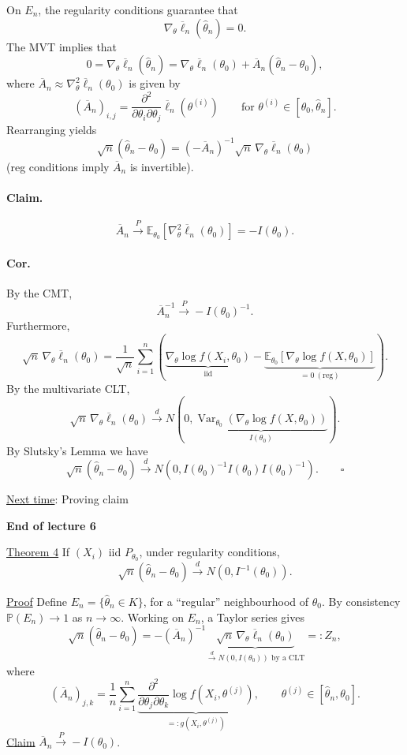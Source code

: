 \documentclass[11pt,a4paper]{article}
\begin{document}
On $E_n$, the regularity conditions guarantee that
\[
\nabla_\theta\overline{\ell}_n(\hat{\theta}_n)=0.
\]
The MVT implies that
\[
0=\nabla_\theta\overline{\ell}_n(\hat{\theta}_n)
=\nabla_\theta\overline{\ell}_n(\theta_0)
+\overline{A}_n(\hat{\theta}_n-\theta_0),
\]
where $\overline{A}_n\approx\nabla_\theta^2\overline{\ell}_n(\theta_0)$ is given by
\[
(\overline{A}_n)_{i,j}
=\frac{\partial^2}{\partial\theta_i\partial\theta_j}
\overline{\ell}_n(\theta^{(i)})
\qquad\text{for }\theta^{(i)}\in[\theta_0,\hat{\theta}_n].
\]
Rearranging yields
\[
\sqrt{n}(\hat{\theta}_n-\theta_0)
=(-\overline{A}_n)^{-1}\sqrt{n}\,\nabla_\theta\overline{\ell}_n(\theta_0)
\]
(reg conditions imply $\overline{A}_n$ is invertible).

\paragraph{Claim.}
\[
\overline{A}_n\xrightarrow{P}
\mathbb{E}_{\theta_0}[\nabla_\theta^2\overline{\ell}_n(\theta_0)]
=-I(\theta_0).
\]
\paragraph{Cor.}
By the CMT,
\[
\overline{A}_n^{-1}\xrightarrow{P}-I(\theta_0)^{-1}.
\]
Furthermore,
\[
\sqrt{n}\,\nabla_\theta\overline{\ell}_n(\theta_0)
=\frac{1}{\sqrt{n}}\sum_{i=1}^n
\left(\underbrace{\nabla_\theta\log f(X_i,\theta_0)}_{\mathrm{iid}}
-\underbrace{\mathbb{E}_{\theta_0}[\nabla_\theta\log f(X,\theta_0)]}
_{=0\ (\mathrm{reg})}\right).
\]
By the multivariate CLT,
\[
\sqrt{n}\,\nabla_\theta\overline{\ell}_n(\theta_0)
\xrightarrow{d}
N\left(0,\underbrace{\operatorname{Var}_{\theta_0}
(\nabla_\theta\log f(X,\theta_0))}_{I(\theta_0)}\right).
\]
By Slutsky's Lemma we have
\[
\sqrt{n}(\hat{\theta}_n-\theta_0)\xrightarrow{d}
N\left(0,I(\theta_0)^{-1}I(\theta_0)I(\theta_0)^{-1}\right).
\qquad\square
\]

\noindent\underline{Next time}: Proving claim

\begin{center}
\textbf{End of lecture 6}
\end{center}
\noindent\underline{Theorem 4}\quad
If $(X_i)$ iid $P_{\theta_0}$, under regularity conditions,
\[
\sqrt{n}(\hat{\theta}_n-\theta_0)\xrightarrow{d}N(0,I^{-1}(\theta_0)).
\]

\noindent\underline{Proof}\quad
Define $E_n=\{\hat{\theta}_n\in K\}$, for a ``regular'' neighbourhood of $\theta_0$.
By consistency $\mathbb{P}(E_n)\to1$ as $n\to\infty$.
Working on $E_n$, a Taylor series gives
\[
\sqrt{n}(\hat{\theta}_n-\theta_0)
=-(\overline{A}_n)^{-1}
\underbrace{\sqrt{n}\,\nabla_\theta\overline{\ell}_n(\theta_0)}
_{\xrightarrow{d}N(0,I(\theta_0))\text{ by a CLT}}
=:Z_n,
\]
where
\[
(\overline{A}_n)_{j,k}
=\frac1n\sum_{i=1}^n
\underbrace{\frac{\partial^2}{\partial\theta_j\partial\theta_k}
\log f(X_i,\theta^{(j)})}_{=:g(X_i,\theta^{(j)})},
\qquad\theta^{(j)}\in[\hat{\theta}_n,\theta_0].
\]
\noindent\underline{Claim}\quad
$\overline{A}_n\xrightarrow{P}-I(\theta_0)$.
\end{document}
